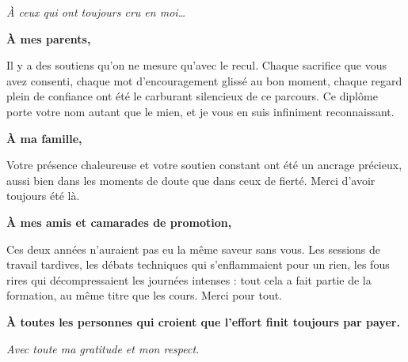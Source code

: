 \documentclass[12pt, a4paper]{report}
\begin{document}
\vspace*{1cm}

\begin{flushright}
{\Large\itshape À ceux qui ont toujours cru en moi\ldots}
\end{flushright}

\vspace{1.5cm}

\begin{center}
\itshape

\textbf{À mes parents,}

\vspace{0.5cm}

Il y a des soutiens qu'on ne mesure qu'avec le recul. Chaque sacrifice
que vous avez consenti, chaque mot d'encouragement glissé au bon moment,
chaque regard plein de confiance ont été le carburant silencieux de ce
parcours. Ce diplôme porte votre nom autant que le mien, et je vous en
suis infiniment reconnaissant.

\vspace{1.2cm}

\textbf{À ma famille,}

\vspace{0.5cm}

Votre présence chaleureuse et votre soutien constant ont été un ancrage
précieux, aussi bien dans les moments de doute que dans ceux de fierté.
Merci d'avoir toujours été là.

\vspace{1.2cm}

\textbf{À mes amis et camarades de promotion,}

\vspace{0.5cm}

Ces deux années n'auraient pas eu la même saveur sans vous. Les sessions
de travail tardives, les débats techniques qui s'enflammaient pour
un rien, les fous rires qui décompressaient les journées intenses :
tout cela a fait partie de la formation, au même titre que les cours.
Merci pour tout.

\vspace{1.2cm}

\textbf{À toutes les personnes qui croient que l'effort finit toujours par payer.}

\vspace{2cm}

\normalsize\textit{Avec toute ma gratitude et mon respect.}

\end{center}
\end{document}
